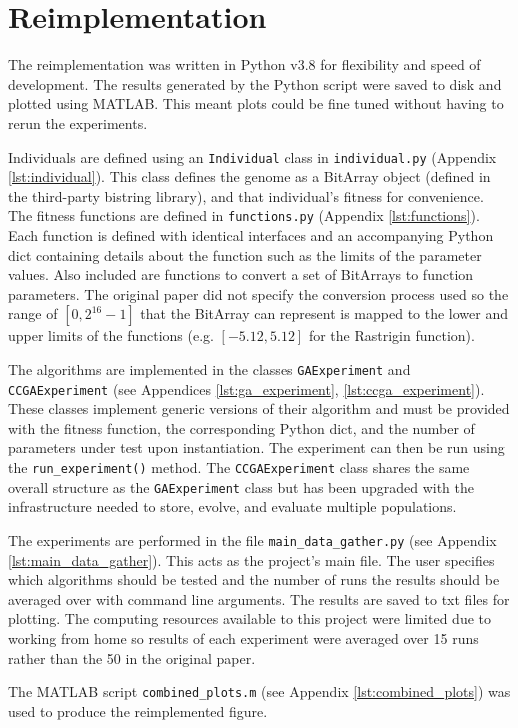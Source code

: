 \section{Reimplementation} \label{sec:reimplementation}

The reimplementation was written in Python v3.8 for flexibility and speed of development.
The results generated by the Python script were saved to disk and plotted using MATLAB.
This meant plots could be fine tuned without having to rerun the experiments.

Individuals are defined using an \texttt{Individual} class in \texttt{individual.py} (Appendix \ref{lst:individual}). 
This class defines the genome as a BitArray object (defined in the third-party bistring library\cite{bistring-repo}), and that individual's fitness for convenience.
The fitness functions are defined in \texttt{functions.py} (Appendix \ref{lst:functions}). 
Each function is defined with identical interfaces and an accompanying Python dict containing details about the function such as the limits of the parameter values.
Also included are functions to convert a set of BitArrays to function parameters.
The original paper did not specify the conversion process used so the range of $[0, 2^{16} - 1]$ that the BitArray can represent is mapped to the lower and upper limits of the functions (e.g. $[-5.12, 5.12]$ for the Rastrigin function).

The algorithms are implemented in the classes \texttt{GAExperiment} and \texttt{CCGAExperiment} (see Appendices \ref{lst:ga_experiment}, \ref{lst:ccga_experiment}). 
These classes implement generic versions of their algorithm and must be provided with the fitness function, the corresponding Python dict, and the number of parameters under test upon instantiation.
The experiment can then be run using the \texttt{run\_experiment()} method.
The \texttt{CCGAExperiment} class shares the same overall structure as the \texttt{GAExperiment} class but has been upgraded with the infrastructure needed to store, evolve, and evaluate multiple populations.

The experiments are performed in the file \texttt{main\_data\_gather.py} (see Appendix \ref{lst:main_data_gather}).
This acts as the project's main file.
The user specifies which algorithms should be tested and the number of runs the results should be averaged over with command line arguments.
The results are saved to txt files for plotting.
The computing resources available to this project were limited due to working from home so results of each experiment were averaged over 15 runs rather than the 50 in the original paper.

The MATLAB script \texttt{combined\_plots.m} (see Appendix \ref{lst:combined_plots}) was used to produce the reimplemented figure.
